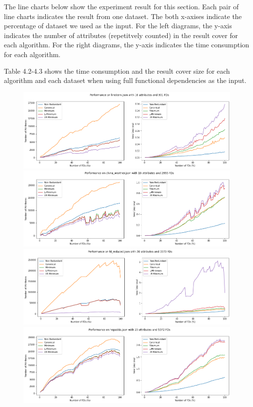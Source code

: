 \documentclass[11pt]{book}
\begin{document}
The line charts below show the experiment result for this section. Each pair of line charts indicates the result from one dataset. The both x-axises indicate the percentage of dataset we used as the input. For the left diagrams, the y-axis indicates the number of attributes (repetitvely counted) in the result cover for each algorithm. For the right diagrams, the y-axis indicates the time consumption for each algorithm.

Table 4.2-4.3 shows the time consumption and the result cover size for each algorithm and each dataset when using full functional dependencies as the input.

\begin{figure}
	\centering
	\includegraphics[width=\textwidth]{./diagrams/lab1/lineitem.png}
	\includegraphics[width=\textwidth]{./diagrams/lab1/china_weather.png}
	\includegraphics[width=\textwidth]{./diagrams/lab1/fd_reduced.png}
	\includegraphics[width=\textwidth]{./diagrams/lab1/hepatitis.png}
\end{figure}
\end{document}
